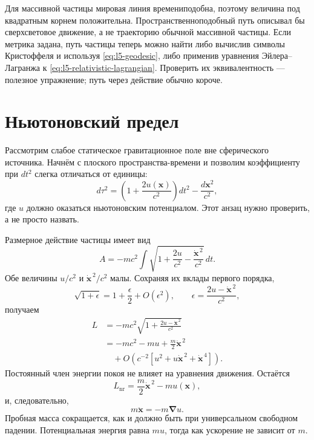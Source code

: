 Для массивной частицы мировая линия времениподобна, поэтому величина под квадратным корнем положительна. Пространственноподобный путь описывал бы сверхсветовое движение, а не траекторию обычной массивной частицы. Если метрика задана, путь частицы теперь можно найти либо вычислив символы Кристоффеля и используя \eqref{eq:l5-geodesic}, либо применив уравнения Эйлера--Лагранжа к \eqref{eq:l5-relativistic-lagrangian}. Проверить их эквивалентность — полезное упражнение; путь через действие обычно короче.

\section{Ньютоновский предел}

Рассмотрим слабое статическое гравитационное поле вне сферического источника. Начнём с плоского пространства-времени и позволим коэффициенту при \(dt^2\) слегка отличаться от единицы:
\begin{equation}
d\tau^2
=\left(1+\frac{2u(\mathbf{x})}{c^2}\right)dt^2
-\frac{d\mathbf{x}^2}{c^2},
\label{eq:l5-weak-metric}
\end{equation}
где \(u\) должно оказаться ньютоновским потенциалом. Этот анзац нужно проверить, а не просто назвать.

Размерное действие частицы имеет вид
\begin{equation}
A=-mc^2\int
\sqrt{1+\frac{2u}{c^2}
-\frac{\dot{\mathbf{x}}^{\,2}}{c^2}}\,dt.
\label{eq:l5-weak-action}
\end{equation}
Обе величины \(u/c^2\) и \(\dot{\mathbf{x}}^{\,2}/c^2\) малы. Сохраняя их вклады первого порядка,
\begin{equation}
\sqrt{1+\epsilon}
=1+\frac{\epsilon}{2}+O(\epsilon^2),
\qquad
\epsilon=\frac{2u-\dot{\mathbf{x}}^{\,2}}{c^2},
\end{equation}
получаем
\begin{align}
L
&=-mc^2
\sqrt{1+\frac{2u-\dot{\mathbf{x}}^{\,2}}{c^2}}\\
&=-mc^2-mu+\frac{m}{2}\dot{\mathbf{x}}^{\,2}\\
&\quad+O\!\left(c^{-2}
 [u^2+u\dot{\mathbf{x}}^{\,2}+\dot{\mathbf{x}}^{\,4}]\right).
\label{eq:l5-newton-expansion}
\end{align}
Постоянный член энергии покоя не влияет на уравнения движения. Остаётся
\begin{equation}
L_{\mathrm{nr}}
=\frac{m}{2}\dot{\mathbf{x}}^{\,2}-m u(\mathbf{x}),
\label{eq:l5-newton-lagrangian}
\end{equation}
и, следовательно,
\begin{equation}
m\ddot{\mathbf{x}}=-m\boldsymbol{\nabla}u.
\label{eq:l5-newton-equation}
\end{equation}
Пробная масса сокращается, как и должно быть при универсальном свободном падении. Потенциальная энергия равна \(m u\), тогда как ускорение не зависит от \(m\).

